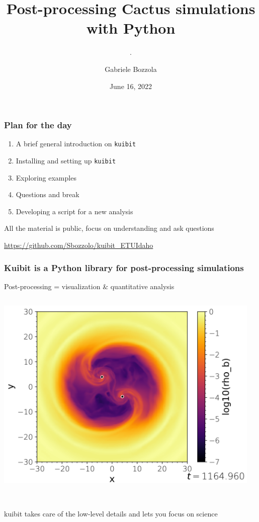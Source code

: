 \documentclass[compress, aspectratio=169]{beamer}
\title{\Large \Medium Post-processing Cactus simulations with Python}
\subtitle{\tiny .}
\date{June 16, 2022 \vspace*{-0.25cm}}
\author{{Gabriele Bozzola}}
\institute{Department of Astronomy and Steward Observatory, \\
  University of Arizona}
\begin{document}
{
  \begin{frame}
    \titlepage
  \end{frame}
}

\begin{frame}
  \frametitle{Plan for the day}
  \centering
    \begin{enumerate}
      \item A brief general introduction on \texttt{kuibit}
      \item Installing and setting up \texttt{kuibit}
      \item Exploring examples
      \item Questions and break
      \item Developing a script for a new analysis
    \end{enumerate}
    All the material is public, focus on understanding and ask questions

    \url{https://github.com/Sbozzolo/kuibit_ETUIdaho}
\end{frame}

\begin{frame}
  \frametitle{Kuibit is a Python library for post-processing simulations}
  \centering

  Post-processing = visualization \& quantitative analysis \\[1cm]

     \begin{columns}
       \begin{column}{0.5\linewidth}
         \centering
         \includegraphics[width=0.8\columnwidth]{grid2D}
       \end{column}
       \begin{column}{0.5\linewidth}
         \hspace{-1cm}
         
       \end{column}
     \end{columns}
     \hfill\\[1cm]

    {\Medium kuibit takes care of the low-level details and lets you focus
       on science}
\end{frame}
\end{document}
